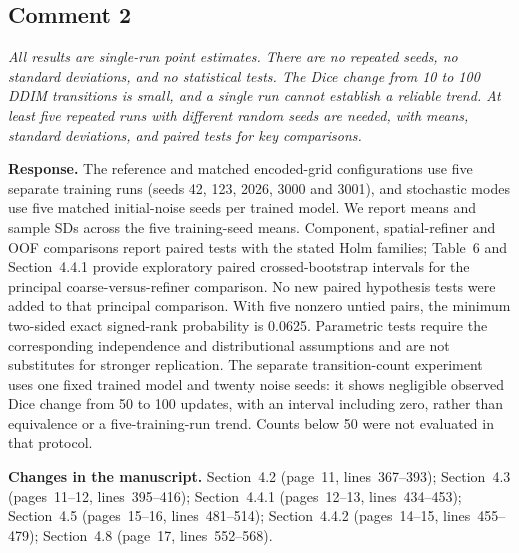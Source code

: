 \documentclass[11pt,a4paper]{article}
\newenvironment{revcomment}{\par\medskip\noindent\begin{minipage}{\linewidth}\itshape}{\end{minipage}\par\smallskip}
\begin{document}
\subsection*{Comment 2}
\begin{revcomment}All results are single-run point estimates. There are no repeated seeds, no standard deviations, and no statistical tests. The Dice change from 10 to 100 DDIM transitions is small, and a single run cannot establish a reliable trend. At least five repeated runs with different random seeds are needed, with means, standard deviations, and paired tests for key comparisons.\end{revcomment}
\textbf{Response.} The reference and matched encoded-grid configurations use five separate training runs (seeds 42, 123, 2026, 3000 and 3001), and stochastic modes use five matched initial-noise seeds per trained model. We report means and sample SDs across the five training-seed means. Component, spatial-refiner and OOF comparisons report paired tests with the stated Holm families; Table~6 and Section~4.4.1 provide exploratory paired crossed-bootstrap intervals for the principal coarse-versus-refiner comparison. No new paired hypothesis tests were added to that principal comparison. With five nonzero untied pairs, the minimum two-sided exact signed-rank probability is 0.0625. Parametric tests require the corresponding independence and distributional assumptions and are not substitutes for stronger replication. The separate transition-count experiment uses one fixed trained model and twenty noise seeds: it shows negligible observed Dice change from 50 to 100 updates, with an interval including zero, rather than equivalence or a five-training-run trend. Counts below 50 were not evaluated in that protocol.

\textbf{Changes in the manuscript.} Section~4.2 (page~11, lines~367--393); Section~4.3 (pages~11--12, lines~395--416); Section~4.4.1 (pages~12--13, lines~434--453); Section~4.5 (pages~15--16, lines~481--514); Section~4.4.2 (pages~14--15, lines~455--479); Section~4.8 (page~17, lines~552--568).
\end{document}
